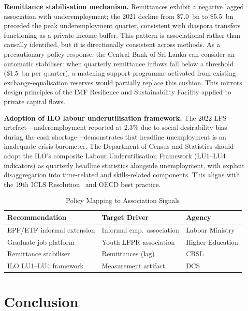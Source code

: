\documentclass[sigconf]{acmart}
\begin{document}
\textbf{Remittance stabilisation mechanism.}
Remittances exhibit a negative lagged association with underemployment;
the 2021 decline from \$7.0~bn to \$5.5~bn preceded the peak
underemployment quarter, consistent with diaspora transfers functioning
as a private income buffer. This pattern is associational rather than
causally identified, but it is directionally consistent across methods.
As a precautionary policy response, the Central Bank of Sri Lanka can
consider an automatic stabiliser: when quarterly remittance inflows fall
below a threshold (\$1.5~bn per quarter), a matching support programme
activated from existing exchange-equalisation reserves would partially
replace this cushion. This mirrors design principles of the IMF
Resilience and Sustainability Facility applied to private capital flows.
 
\textbf{Adoption of ILO labour underutilisation framework.}
The 2022 LFS artefact---underemployment reported at 2.3\% due to
social desirability bias during the cash shortage---demonstrates that
headline unemployment is an inadequate crisis barometer. The Department
of Census and Statistics should adopt the ILO's composite Labour
Underutilisation Framework (LU1--LU4 indicators) as quarterly headline
statistics alongside unemployment, with explicit disaggregation into
time-related and skills-related components. This aligns with the 19th
ICLS Resolution~\cite{ilo2013} and OECD best practice.
 
\begin{table}[h]
\centering
\caption{Policy Mapping to Association Signals}
\label{tab:policy}
\footnotesize
\setlength{\tabcolsep}{4pt}
\begin{tabular}{@{}lll@{}}
\toprule
\textbf{Recommendation} & \textbf{Target Driver} & \textbf{Agency} \\
\midrule
EPF/ETF informal extension  & Informal emp.\ association  & Labour Ministry \\
Graduate job platform       & Youth LFPR association      & Higher Education \\
Remittance stabiliser       & Remittances (lag)     & CBSL            \\
ILO LU1--LU4 framework      & Measurement artifact  & DCS             \\
\bottomrule
\end{tabular}
\end{table}

\section{Conclusion}
\end{document}
